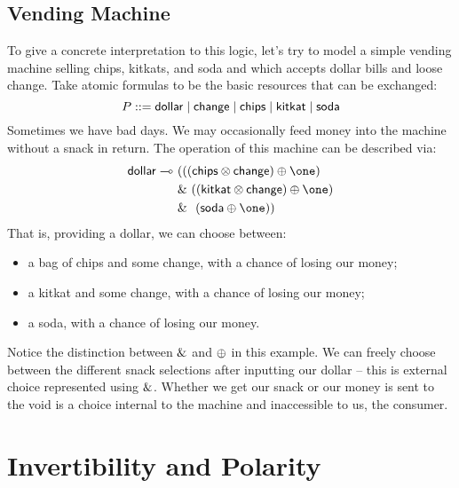 \documentclass{article}
\begin{document}
\subsection{Vending Machine}

To give a concrete interpretation to this logic, let's try to model a simple vending machine selling chips, kitkats, and soda and which accepts dollar bills and loose change. Take atomic formulas to be the basic resources that can be exchanged: 
\[
  P ::= {\sf dollar} 
  \mid {\sf change}
  \mid {\sf chips}
  \mid {\sf kitkat}
  \mid {\sf soda}
\]
Sometimes we have bad days. We may occasionally feed money into the machine without a snack in return. The operation of this machine can be described via: 
\begin{align*}
  {\sf dollar} \lolli~ 
    & ((({\sf chips} \tensor {\sf change}) \linPlus \one) \\
    & \&~ (({\sf kitkat} \tensor {\sf change}) \linPlus \one) \\
    & \&~~({\sf soda} \linPlus \one))
\end{align*}
That is, providing a dollar, we can choose between:
\begin{itemize}
  \item a bag of chips and some change, with a chance of losing our money;
  \item a kitkat and some change, with a chance of losing our money;
  \item a soda, with a chance of losing our money.
\end{itemize}
Notice the distinction between $\&$ and $\oplus$ in this example. We can freely choose between the different snack selections after inputting our dollar -- this is external choice represented using $\&$. Whether we get our snack or our money is sent to the void is a choice internal to the machine and inaccessible to us, the consumer. 

\section{Invertibility and Polarity}
\end{document}
